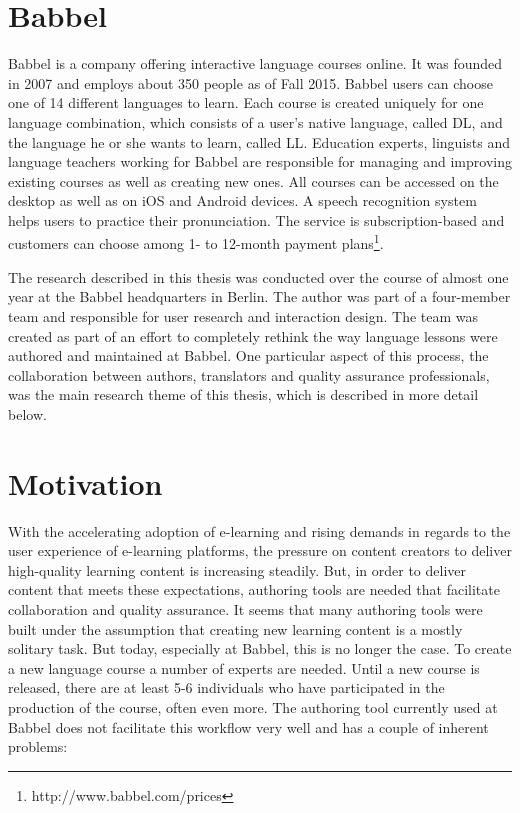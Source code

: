 \section{Babbel}
Babbel is a company offering interactive language courses online. It was founded in 2007 and employs about 350 people as of Fall 2015. Babbel users can choose one of 14 different languages to learn. Each course is created uniquely for one language combination, which consists of a user's native language, called \ac{DL}, and the language he or she wants to learn, called \ac{LL}. Education experts, linguists and language teachers working for Babbel are responsible for managing and improving existing courses as well as creating new ones. All courses can be accessed on the desktop as well as on iOS and Android devices. A speech recognition system helps users to practice their pronunciation. The service is subscription-based and customers can choose among 1- to 12-month payment plans\footnote{http://www.babbel.com/prices}.

The research described in this thesis was conducted over the course of almost one year at the Babbel headquarters in Berlin. The author was part of a four-member team and responsible for user research and interaction design. The team was created as part of an effort to completely rethink the way language lessons were authored and maintained at Babbel. One particular aspect of this process, the collaboration between authors, translators and quality assurance professionals, was the main research theme of this thesis, which is described in more detail below.

\section{Motivation} %
With the accelerating adoption of e-learning and rising demands in regards to the user experience of e-learning platforms, the pressure on content creators to deliver high-quality learning content is increasing steadily. But, in order to deliver content that meets these expectations, authoring tools are needed that facilitate collaboration and quality assurance. It seems that many authoring tools were built under the assumption that creating new learning content is a mostly solitary task. But today, especially at Babbel, this is no longer the case. To create a new language course a number of experts are needed. Until a new course is released, there are at least 5-6 individuals who have participated in the production of the course, often even more. The authoring tool currently used at Babbel does not facilitate this workflow very well and has a couple of inherent problems:

